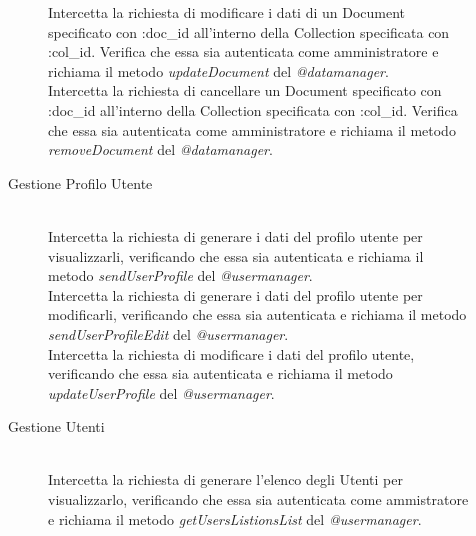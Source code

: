 \begin{description}
\begin{description}
\begin{mldescription}
  Intercetta la richiesta di modificare i dati di un Document specificato con :doc\_id all'interno della Collection specificata con :col\_id. Verifica che essa sia autenticata come amministratore e richiama il metodo \textit{updateDocument} del \textit{@datamanager}.
   \hfill \\
  Intercetta la richiesta di cancellare un Document specificato con :doc\_id all'interno della Collection specificata con :col\_id. Verifica che essa sia autenticata come amministratore e richiama il metodo \textit{removeDocument} del \textit{@datamanager}.
 \end{mldescription}
 \item[Gestione Profilo Utente]
 \begin{mldescription}
   \hfill \\
    Intercetta la richiesta di generare i dati del profilo utente per visualizzarli, verificando che essa sia autenticata e richiama il metodo \textit{sendUserProfile} del \textit{@usermanager}.
    \hfill \\
   Intercetta la richiesta di generare i dati del profilo utente per modificarli, verificando che essa sia autenticata e richiama il metodo \textit{sendUserProfileEdit} del \textit{@usermanager}.
    \hfill \\
   Intercetta la richiesta di modificare i dati del profilo utente, verificando che essa sia autenticata e richiama il metodo \textit{updateUserProfile} del \textit{@usermanager}.
 \end{mldescription}  
 \item[Gestione Utenti] 
  \begin{mldescription}
     \hfill \\
	 Intercetta la richiesta di generare l'elenco degli Utenti per visualizzarlo, verificando che essa sia autenticata come ammistratore e richiama il metodo \textit{getUsersListionsList} del \textit{@usermanager}.

\end{mldescription}
\end{description}
\end{description}
